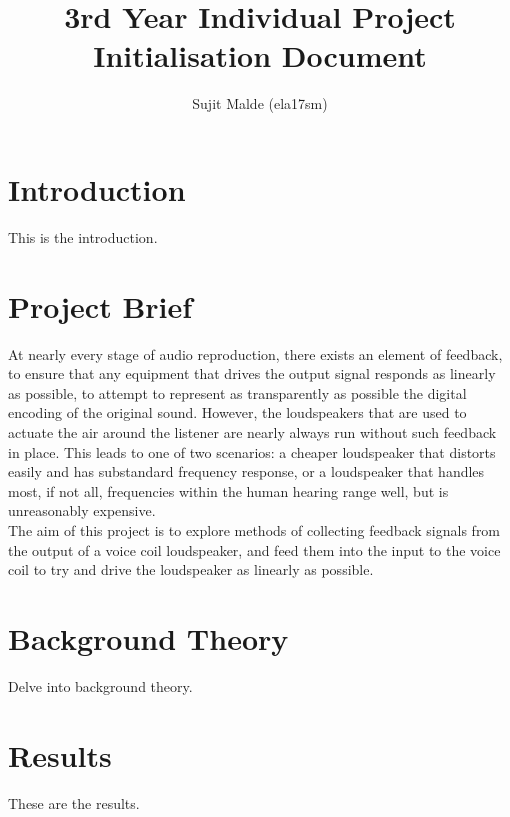 \documentclass[a4paper, margin = 1in, 12pt]{article}
\begin{document}
\title{3rd Year Individual Project Initialisation Document}
\author{Sujit Malde (ela17sm)}
\maketitle

\section{Introduction}
This is the introduction.

\section{Project Brief}
At nearly every stage of audio reproduction, there exists an element of feedback, to ensure that any equipment that drives the output signal responds as linearly as possible, to attempt to represent as transparently as possible the digital encoding of the original sound. However, the loudspeakers that are used to actuate the air around the listener are nearly always run without such feedback in place. This leads to one of two scenarios: a cheaper loudspeaker that distorts easily and has substandard frequency response, or a loudspeaker that handles most, if not all, frequencies within the human hearing range well, but is unreasonably expensive.
\\The aim of this project is to explore methods of collecting feedback signals from the output of a voice coil loudspeaker, and feed them into the input to the voice coil to try and drive the loudspeaker as linearly as possible.

\section{Background Theory}
Delve into background theory.

\section{Results}
These are the results.
\end{document}
